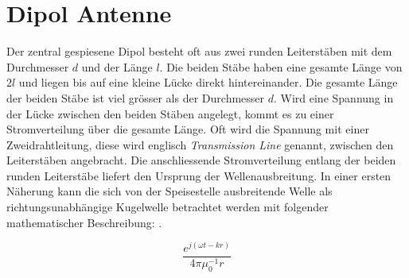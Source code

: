 
\section{Dipol Antenne}\label{sec:DipolAntenne}
Der zentral gespiesene Dipol besteht oft aus zwei runden Leiterstäben mit dem Durchmesser $d$ und der Länge $l$. Die beiden Stäbe haben eine gesamte Länge von $2l$ und liegen bis auf eine kleine Lücke direkt hintereinander. Die gesamte Länge der beiden Stäbe ist viel grösser als der Durchmesser $d$. Wird eine Spannung in der Lücke zwischen den beiden Stäben angelegt, kommt es zu einer Stromverteilung über die gesamte Länge. Oft wird die Spannung mit einer Zweidrahtleitung,  diese wird englisch \textit{Transmission Line} genannt, zwischen den Leiterstäben angebracht. Die anschliessende Stromverteilung entlang der beiden runden Leiterstäbe liefert den Ursprung der Wellenausbreitung. In einer ersten Näherung kann die sich von der Speisestelle ausbreitende Welle als richtungsunabhängige Kugelwelle betrachtet werden mit folgender mathematischer Beschreibung: \cite{elliott1981antenna}.

\begin{equation}\label{term:Kugelwelle}
\frac{e^{j(\omega t-kr)}}{4\pi \mu_{0}^{-1}r}
\end{equation}


